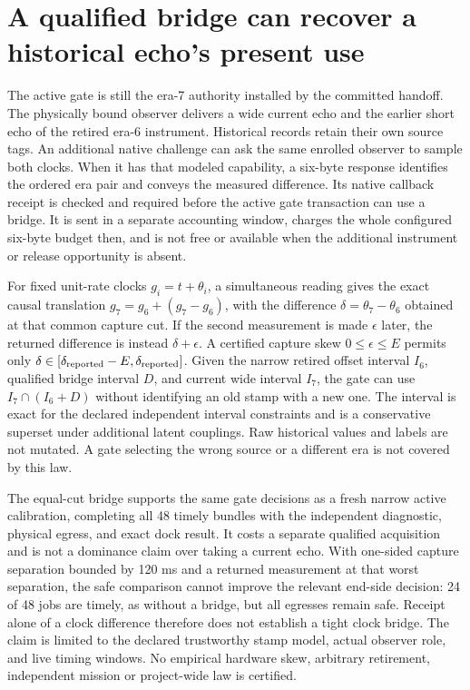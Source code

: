 \documentclass{article}
\begin{document}
\section*{A qualified bridge can recover a historical echo's present use}
The active gate is still the era-7 authority installed by the committed
handoff. The physically bound observer delivers a wide current echo
and the earlier short echo of the retired era-6 instrument. Historical
records retain their own source tags. An additional native challenge
can ask the same enrolled observer to sample both clocks. When it has
that modeled capability, a six-byte response identifies the ordered
era pair and conveys the measured difference. Its native callback
receipt is checked and required before the active gate transaction can
use a bridge. It is sent in a separate accounting window, charges the
whole configured six-byte budget then, and is not free or available
when the additional instrument or release opportunity is absent.

For fixed unit-rate clocks $g_i=t+\theta_i$, a simultaneous reading
gives the exact causal translation $g_7=g_6+(g_7-g_6)$, with the
difference $\delta=\theta_7-\theta_6$ obtained at that common
capture cut. If the second measurement is made $\epsilon$ later,
the returned difference is instead $\delta+\epsilon$. A certified
capture skew $0\le\epsilon\le E$ permits only
$\delta\in[\delta_{\rm reported}-E,\delta_{\rm reported}]$.
Given the narrow retired offset interval $I_6$, qualified bridge
interval $D$, and current wide interval $I_7$, the gate can use
$I_7\cap(I_6+D)$ without identifying an old stamp with a new one.
The interval is exact for the declared independent interval
constraints and is a conservative superset under additional
latent couplings. Raw historical values and labels are not mutated.
A gate selecting the wrong source or a different era is not
covered by this law.

The equal-cut bridge supports the same gate decisions as a fresh
narrow active calibration, completing all 48 timely bundles with
the independent diagnostic, physical egress, and exact dock result.
It costs a separate qualified acquisition and is not a dominance
claim over taking a current echo. With one-sided capture separation
bounded by 120 ms and a returned measurement at that worst separation,
the safe comparison cannot improve the relevant end-side decision:
24 of 48 jobs are timely, as without a bridge, but all egresses
remain safe. Receipt alone of a clock difference therefore does
not establish a tight clock bridge. The claim is limited to the
declared trustworthy stamp model, actual observer role, and live
timing windows. No empirical hardware skew, arbitrary retirement,
independent mission or project-wide law is certified.
\end{document}
